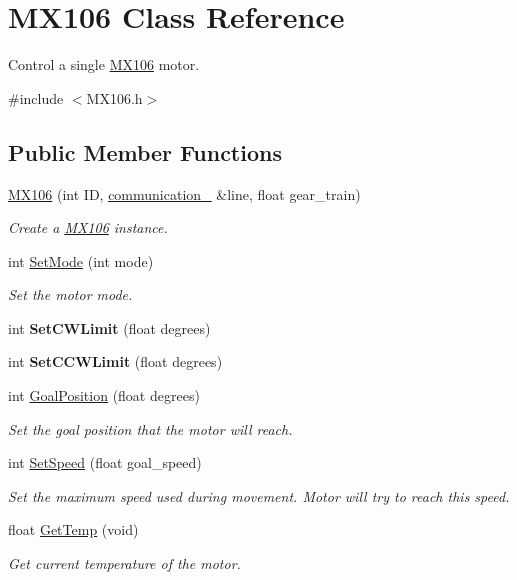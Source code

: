 \hypertarget{class_m_x106}{}\section{M\+X106 Class Reference}
\label{class_m_x106}


Control a single \hyperlink{class_m_x106}{M\+X106} motor.  




{\ttfamily \#include $<$M\+X106.\+h$>$}

\subsection*{Public Member Functions}
\begin{DoxyCompactItemize}
\item 
\hyperlink{class_m_x106_ac413364acbcb66c88315d418a5be7d8e}{M\+X106} (int ID, \hyperlink{classcommunication__1}{communication\+\_} \&line, float gear\+\_\+train)
\begin{DoxyCompactList}\small\item\em Create a \hyperlink{class_m_x106}{M\+X106} instance. \end{DoxyCompactList}\item 
int \hyperlink{class_m_x106_a7de70ad947eebbe398e4fcf18222a8de}{Set\+Mode} (int mode)
\begin{DoxyCompactList}\small\item\em Set the motor mode. \end{DoxyCompactList}\item 
int {\bfseries Set\+C\+W\+Limit} (float degrees)\hypertarget{class_m_x106_a1ac021a9b34ba0970529bee8ae4e168f}{}\label{class_m_x106_a1ac021a9b34ba0970529bee8ae4e168f}

\item 
int {\bfseries Set\+C\+C\+W\+Limit} (float degrees)\hypertarget{class_m_x106_a86db972dd474db642a008625bebef821}{}\label{class_m_x106_a86db972dd474db642a008625bebef821}

\item 
int \hyperlink{class_m_x106_afafe22d441e2073dea60acda999cc245}{Goal\+Position} (float degrees)
\begin{DoxyCompactList}\small\item\em Set the goal position that the motor will reach. \end{DoxyCompactList}\item 
int \hyperlink{class_m_x106_ab347df7137e25c8a31d7c6b0c412ed76}{Set\+Speed} (float goal\+\_\+speed)
\begin{DoxyCompactList}\small\item\em Set the maximum speed used during movement. Motor will try to reach this speed. \end{DoxyCompactList}\item 
float \hyperlink{class_m_x106_a550761cebd3a9571f0ad001baace5157}{Get\+Temp} (void)
\begin{DoxyCompactList}\small\item\em Get current temperature of the motor. \end{DoxyCompactList}\end{DoxyCompactItemize}


